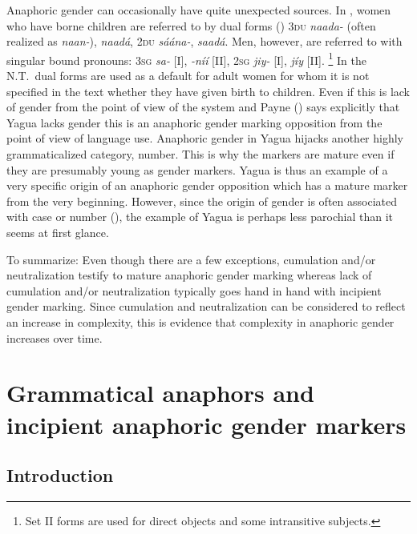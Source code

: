 \documentclass[output=collectionpaper]{langsci/langscibook}
\begin{document}
Anaphoric gender can occasionally have quite unexpected sources. In , women who have borne children are referred to by dual forms (\citealt[42]{Payne1985}) \textendash{} \textsc{3du} \textit{naada-} (often realized as \textit{naan-}), \textit{naadá}, \textsc{2du} \textit{sáána-}, \textit{saadá}. Men, however, are referred to with singular bound pronouns: \textsc{3sg} \textit{sa-} [I], \textit{-níí} [II], \textsc{2sg} \textit{jiy-} [I], \textit{jíy} [II].%
\footnote{%
Set II forms are used for direct objects and some intransitive subjects.
} %
In the N.T.\ dual forms are used as a default for adult women for whom it is not specified in the text whether they have given birth to children. Even if this is lack of gender from the point of view of the system \textendash{} and Payne (\citealt*[42]{Payne1985}) says explicitly that Yagua lacks gender \textendash{} this is an anaphoric gender marking opposition from the point of view of language use. Anaphoric gender in Yagua hijacks another highly grammaticalized category, number. This is why the markers are mature even if they are presumably young as gender markers. Yagua is thus an example of a very specific origin of an anaphoric gender opposition which has a mature marker from the very beginning. However, since the origin of gender is often associated with case or number (), the example of Yagua is perhaps less parochial than it seems at first glance.

To summarize: Even though there are a few exceptions, cumulation and/or neutralization testify to mature anaphoric gender marking whereas lack of cumulation and/or neutralization typically goes hand in hand with incipient gender marking. Since cumulation and neutralization can be considered to reflect an increase in complexity, this is evidence that complexity in anaphoric gender increases over time.

\section{Grammatical anaphors and incipient anaphoric gender markers}
\label{sec:BW:5}

\subsection{Introduction}
\label{sec:BW:5.1}
\end{document}
